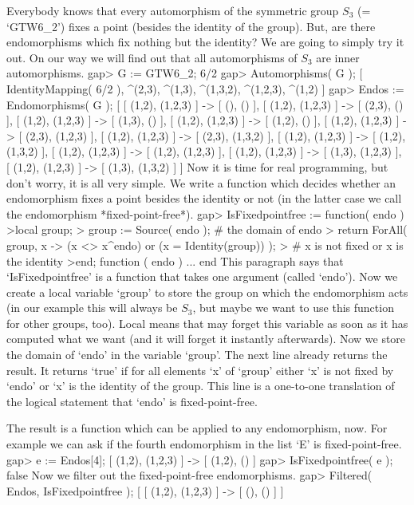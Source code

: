         Everybody knows that every automorphism of the symmetric group $S_3$
        (= `GTW6_2') fixes a point (besides the identity of the group). But,
        are there endomorphisms which fix nothing but the identity? We are
        going to simply try it out. On our way we will find out that all
        automorphisms of $S_3$ are inner automorphisms.
\beginexample
    gap> G := GTW6_2;
    6/2
    gap> Automorphisms( G );
    [ IdentityMapping( 6/2 ), ^(2,3), ^(1,3), ^(1,3,2), ^(1,2,3), ^(1,2) ]
    gap> Endos := Endomorphisms( G );
    [ [ (1,2), (1,2,3) ] -> [ (), () ], [ (1,2), (1,2,3) ] -> [ (2,3), () ],
      [ (1,2), (1,2,3) ] -> [ (1,3), () ], [ (1,2), (1,2,3) ] -> [ (1,2), () ],
      [ (1,2), (1,2,3) ] -> [ (2,3), (1,2,3) ],
      [ (1,2), (1,2,3) ] -> [ (2,3), (1,3,2) ],
      [ (1,2), (1,2,3) ] -> [ (1,2), (1,3,2) ],
      [ (1,2), (1,2,3) ] -> [ (1,2), (1,2,3) ],
      [ (1,2), (1,2,3) ] -> [ (1,3), (1,2,3) ],
      [ (1,2), (1,2,3) ] -> [ (1,3), (1,3,2) ] ]
\endexample
        Now it is time for real programming, but don't worry, it is all very
        simple. We write a function which decides whether an endomorphism
        fixes a point besides the identity or not (in the latter case we
        call the endomorphism *fixed-point-free*).
\beginexample
    gap> IsFixedpointfree := function( endo )
    >local group;
    >  group := Source( endo ); # the domain of endo
    >  return ForAll( group, x -> (x <> x^endo) or (x = Identity(group)) );
    >  #                           x is not fixed or x is the identity
    >end;
    function ( endo ) ... end
\endexample
        This paragraph says that `IsFixedpointfree' is a function that takes
        one argument (called `endo'). Now we create a local variable `group' to
        store the group on which the endomorphism acts (in our example this
        will always be $S_3$, but maybe we want to use this function for
        other groups, too). Local means that {\GAP} may forget this variable
        as soon as it has computed what we want (and it will forget it
        instantly afterwards). Now we store the domain of `endo' in the
        variable `group'. The next line already returns the result. It returns
        `true' if for all elements `x' of `group' either `x' is not fixed
        by `endo' or `x' is the identity of the group. This line is a
        one-to-one translation of the logical statement that `endo' is
        fixed-point-free.

        The result is a function which can be applied to any endomorphism, now.
        For example we can ask if the fourth endomorphism in the list `E' is
        fixed-point-free.
\beginexample
    gap> e := Endos[4];
    [ (1,2), (1,2,3) ] -> [ (1,2), () ]
    gap> IsFixedpointfree( e );
    false
\endexample
        Now we filter out the fixed-point-free endomorphisms.
\beginexample
    gap> Filtered( Endos, IsFixedpointfree );
    [ [ (1,2), (1,2,3) ] -> [ (), () ] ]
\endexample

